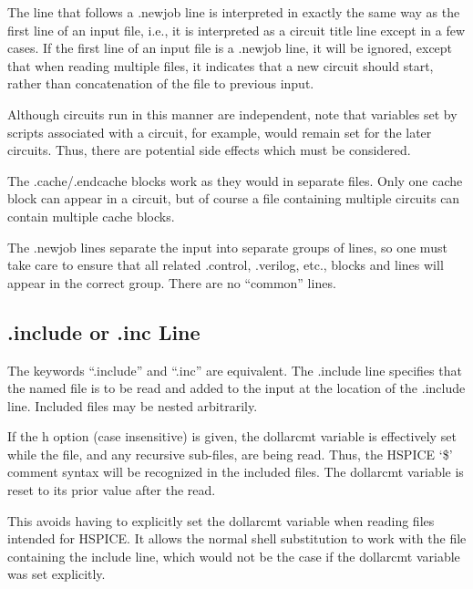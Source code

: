 The line that follows a {\vt .newjob} line is interpreted in exactly
the same way as the first line of an input file, i.e., it is
interpreted as a circuit title line except in a few cases.  If the
first line of an input file is a {\vt .newjob} line, it will be
ignored, except that when reading multiple files, it indicates that a
new circuit should start, rather than concatenation of the file to
previous input.

Although circuits run in this manner are independent, note that
variables set by scripts associated with a circuit, for example, would
remain set for the later circuits.  Thus, there are potential side
effects which must be considered.

The {\vt .cache}/{\vt .endcache} blocks work as they would in separate
files.  Only one cache block can appear in a circuit, but of course a
file containing multiple circuits can contain multiple cache blocks.

The {\vt .newjob} lines separate the input into separate groups of
lines, so one must take care to ensure that all related {\vt
.control}, {\vt .verilog}, etc., blocks and lines will appear in the
correct group.  There are no ``common'' lines.

\subsection{{\vt .include} or {\vt .inc} Line}

The keywords ``{\vt .include}'' and ``{\vt .inc}'' are equivalent. 
The {\vt .include} line specifies that the named file is to be read
and added to the input at the location of the {\vt .include} line. 
Included files may be nested arbitrarily.

If the {\vt h} option (case insensitive) is given, the {\et dollarcmt}
variable is effectively set while the file, and any recursive
sub-files, are being read.  Thus, the HSPICE `{\vt \$}' comment syntax
will be recognized in the included files.  The {\et dollarcmt}
variable is reset to its prior value after the read.

This avoids having to explicitly set the {\et dollarcmt} variable when
reading files intended for HSPICE.  It allows the normal {\WRspice}
shell substitution to work with the file containing the include line,
which would not be the case if the {\et dollarcmt} variable was set
explicitly.

